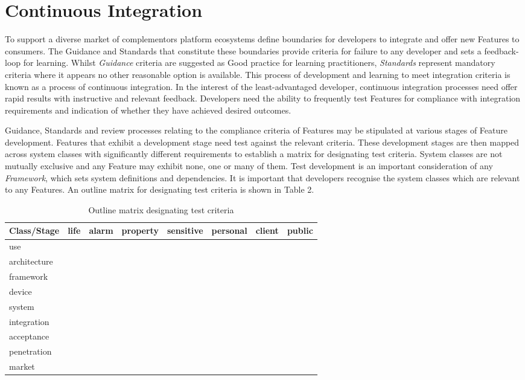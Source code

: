 \documentclass[11pt, oneside]{article}   	%
\begin{document}
\pagebreak

\section{Continuous Integration}
To support a diverse market of complementors platform ecosystems define boundaries for developers to integrate and offer new Features to consumers.
The Guidance and Standards that constitute these boundaries provide criteria for failure to any developer and sets a feedback-loop for learning.
Whilst \emph{Guidance} criteria are suggested as Good practice for learning practitioners, \emph{Standards} represent mandatory criteria where it appears no other reasonable option is available.
This process of development and learning to meet integration criteria is known as a process of continuous integration.
In the interest of the least-advantaged developer, continuous integration processes need offer rapid results with instructive and relevant feedback.
Developers need the ability to frequently test Features for compliance with integration requirements and indication of whether they have achieved desired outcomes.\

Guidance, Standards and review processes relating to the compliance criteria of Features may be stipulated at various stages of Feature development.
Features that exhibit a development stage need test against the relevant criteria.
These development stages are then mapped across system classes with significantly different requirements to establish a matrix for designating test criteria.
System classes are not mutually exclusive and any Feature may exhibit none, one or many of them.
Test development is an important consideration of any \emph{Framework}, which sets system definitions and dependencies.
It is important that developers recognise the system classes which are relevant to any Features.
An outline matrix for designating test criteria is shown in Table 2.

\pagebreak

\FloatBarrier
\begin{table}
	\caption{Outline matrix designating test criteria}
	\begin{center}
		\begin{tabular}{| l | c | c | c | c | c | c | c |}
		\hline
		Class/Stage&life&alarm&property&sensitive&personal&client&public\\
		\hline
		use&&&&&&&\\
		architecture&&&&&&&\\
		framework&&&&&&&\\
		device&&&&&&&\\
		system&&&&&&&\\
		integration&&&&&&&\\
		acceptance&&&&&&&\\
		penetration&&&&&&&\\
		market&&&&&&&\\
		\hline
		\end{tabular}
	\end{center}
	\label{Test matrix}
\end{table}
\FloatBarrier
\end{document}

